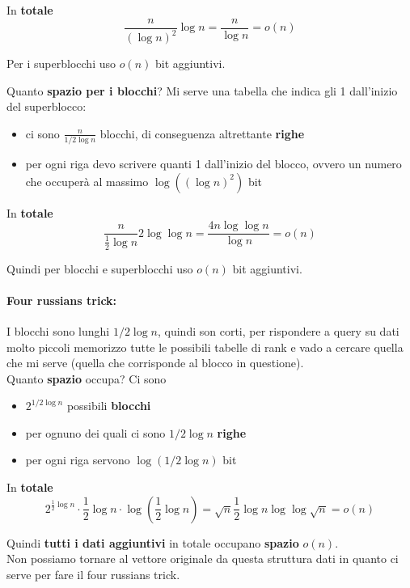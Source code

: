 In \textbf{totale}
$$ \frac{n}{(\log n)^2} \log n = \frac{n}{\log n} = o(n) $$

Per i superblocchi uso $o(n)$ bit aggiuntivi.\\

\newpage

Quanto \textbf{spazio per i blocchi}? Mi serve una tabella che indica gli 1 dall'inizio del superblocco: 
\begin{itemize}
	\item ci sono $\frac{n}{1/2 \log n}$ blocchi, di conseguenza altrettante \textbf{righe}
	\item per ogni riga devo scrivere quanti 1 dall'inizio del blocco, ovvero un numero che occuperà al massimo $\log ((\log n)^2)$ bit
\end{itemize}

In \textbf{totale} 
$$ \frac{n}{\frac{1}{2} \log n} 2 \log \log n = \frac{4 n \log \log n}{ \log n} = o(n) $$

Quindi per blocchi e superblocchi uso $o(n)$ bit aggiuntivi.\\

\paragraph{Four russians trick:} I blocchi sono lunghi $1/2 \log n$, quindi son corti, per rispondere a query su dati molto piccoli memorizzo tutte le possibili tabelle di rank e vado a cercare quella che mi serve (quella che corrisponde al blocco in questione). \\

Quanto \textbf{spazio} occupa? Ci sono 
\begin{itemize}
	\item $2^{1/2 \log n}$ possibili \textbf{blocchi}
	\item per ognuno dei quali ci sono $1/2 \log n$ \textbf{righe}
	\item per ogni riga servono $\log (1/2 \log n)$ bit
\end{itemize}

In \textbf{totale}
$$ 2^{\frac{1}{2} \log n} \cdot \frac{1}{2} \log n \cdot \log \left(\frac{1}{2} \log n\right) = \sqrt{n} \frac{1}{2} \log n \log \log \sqrt{n} = o(n) $$

Quindi \textbf{tutti i dati aggiuntivi} in totale occupano \textbf{spazio} $o(n)$.\\
Non possiamo tornare al vettore originale da questa struttura dati in quanto ci serve per fare il four russians trick.\\

